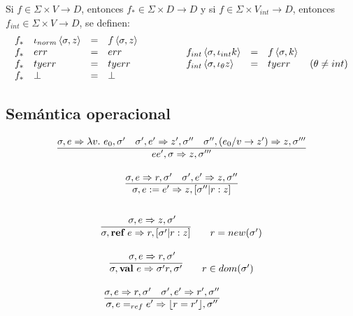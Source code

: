   \vspace{5mm}
  \PN Si $f \in \Sigma\times V\rightarrow D$, entonces $f_* \in \Sigma\times D \rightarrow D$ y
  \PN si $f \in \Sigma\times V_{int}\rightarrow D$, entonces $f_{int} \in \Sigma\times V \rightarrow D$, se definen:
  \[\begin{array}{lllllllllll}
    f_* & \iota_{norm}\left\langle \sigma,z\right\rangle &=& f \left\langle\sigma,z\right\rangle \\
    f_* & err &=& err & \qquad \qquad f_{int} \left\langle \sigma,\iota_{int} k\right\rangle &=& f \left\langle\sigma,k\right\rangle \\
    f_* & tyerr &=& tyerr & \qquad \qquad f_{int} \left\langle \sigma,\iota_{\theta} z\right\rangle &=& tyerr \qquad(\theta\neq int) \\
    f_* & \bot &=& \bot
  \end{array}\]

  \subsection{Semántica operacional} 
    \begin{multicols}{2}  
      \[\begin{array}{c}
        \underline{\sigma,e \Rightarrow \lambda v.\ e_0,\sigma'\quad \sigma',e' \Rightarrow z',\sigma''\quad \sigma'', (e_0/v\rightarrow z') \Rightarrow z,\sigma'''}\\
        ee',\sigma \Rightarrow z,\sigma''' \\ \\

        \underline{\sigma,e \Rightarrow r,\sigma'\quad \sigma',e' \Rightarrow z,\sigma''} \\
        \sigma,e:=e' \Rightarrow z,[\sigma''|r:z] \\ \\
      \end{array}\]
      \[\begin{array}{c}
        \sigma,e \Rightarrow z,\sigma' \qquad \qquad \qquad \\
        \overline{\sigma,\textbf{ref}\ e \Rightarrow r,[\sigma'|r:z]} \qquad r = new(\sigma') \\ \\

        \sigma,e \Rightarrow r,\sigma' \qquad \qquad \qquad \\
        \overline{\sigma,\textbf{val}\ e \Rightarrow \sigma' r,\sigma'} \qquad r \in dom(\sigma') \\ \\

        \underline{\sigma,e \Rightarrow r,\sigma'\quad \sigma',e' \Rightarrow r',\sigma''} \qquad \qquad \\
        \sigma,e=_{ref}e' \Rightarrow \lfloor r=r'\rfloor,\sigma'' \qquad \qquad 
      \end{array}\]
    \end{multicols}

